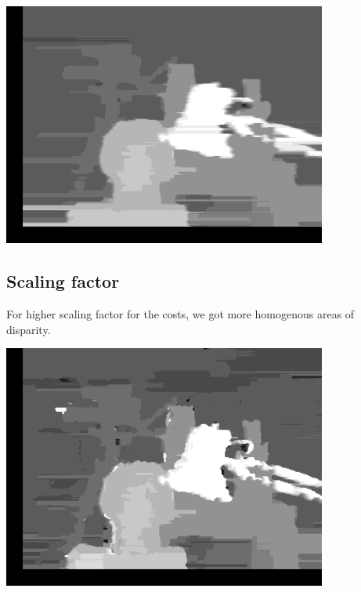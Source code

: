 \documentclass[a4paper]{scrartcl}
\begin{document}
\vspace{1cm}
\begin{minipage}{0.8\textwidth}
  \centering
  \includegraphics[width=0.8\textwidth]{images/squarediff.png}
\end{minipage}


\subsection{Scaling factor}

For higher scaling factor for the costs, we got more homogenous
areas of disparity.

\vspace{1cm}
\begin{minipage}{0.8\textwidth}
  \centering
  \includegraphics[width=0.8\textwidth]{images/scale-0.005.png}
\end{minipage}
\end{document}

